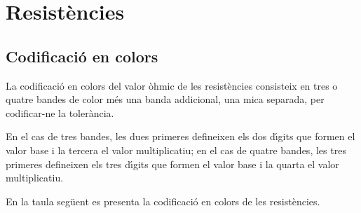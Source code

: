\chapter{Resist\`{e}ncies}

\section{Codificaci\'{o} en colors} 

La codificaci\'{o} en colors del valor \`{o}hmic de les resist\`{e}ncies
consisteix en tres o quatre bandes de color m\'{e}s una banda addicional, una mica separada, per codificar-ne la toler\`{a}ncia.

En el cas de tres bandes, les dues primeres defineixen els dos d\'{\i}gits que formen el valor
base i la tercera el valor  multiplicatiu; en el cas de quatre bandes, les tres primeres
defineixen els tres d\'{\i}gits que formen el valor base i la quarta el valor multiplicatiu.

En la taula seg\"{u}ent es presenta la codificaci\'{o} en colors de les resist\`{e}ncies.

